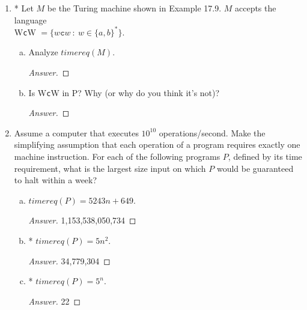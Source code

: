 \documentclass[10pt]{article}
\begin{document}
\begin{enumerate}[1)]
\begin{enumerate}[a)]
\item
Suppose that $timereq(M) = 5^n \cdot 3n^3$.  Circle all of the following statements that are true:
\begin{enumerate}[i)]
\item
$timereq(M) \in O(n^5)$.
\item
$timereq(M) \in O(2^n)$.
\item
$timereq(M) \in O(n!)$.
\end{enumerate}
\begin{proof}[Answer]
iii
\end{proof}
\end{enumerate}


\item
* Let $M$ be the Turing machine shown in Example 17.9.  $M$ accepts the language\\ W\texttt{c}W $= \{w\texttt{c}w\ :\ w \in \{a, b\}^*\}$.
\begin{enumerate}[a)]
\item
Analyze $timereq(M)$.
\begin{proof}[Answer]
\end{proof}
\item
Is W\texttt{c}W in P?  Why (or why do you think it’s not)?
\begin{proof}[Answer]
\end{proof}
\end{enumerate}


\item
Assume a computer that executes $10^{10}$ operations/second.  Make the simplifying assumption that each operation of a program requires exactly one machine instruction.  For each of the following programs $P$, defined by its time requirement, what is the largest size input on which $P$ would be guaranteed to halt within a week?
\begin{enumerate}[a)]
\item
$timereq(P) = 5243n+649$.
\begin{proof}[Answer]
1,153,538,050,734
\end{proof}
\item
* $timereq(P) = 5n^2$.
\begin{proof}[Answer]
34,779,304
\end{proof}
\item
* $timereq(P) = 5^n$.
\begin{proof}[Answer]
22
\end{proof}
\end{enumerate}



\end{enumerate}
\end{document}
